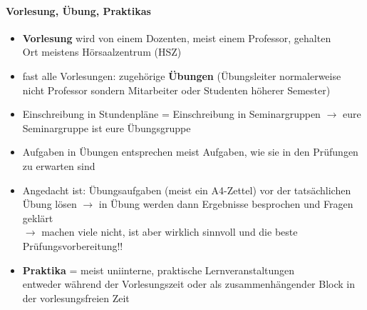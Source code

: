\documentclass[a4paper,12pt]{report}
\begin{document}
\paragraph{Vorlesung, Übung, Praktikas}
\begin{itemize}
	\item \textbf{Vorlesung} wird von einem Dozenten, meist einem Professor, gehalten\\
	Ort meistens Hörsaalzentrum (HSZ)
	\item fast alle Vorlesungen: zugehörige \textbf{Übungen} (Übungsleiter normalerweise nicht Professor sondern Mitarbeiter oder Studenten höherer Semester)
	\item Einschreibung in Stundenpläne = Einschreibung in Seminargruppen $\rightarrow$ eure Seminargruppe ist eure Übungsgruppe
	\item Aufgaben in Übungen entsprechen meist Aufgaben, wie sie in den Prüfungen zu erwarten sind
	\item Angedacht ist: Übungsaufgaben (meist ein A4-Zettel) vor der tatsächlichen Übung lösen $\rightarrow$ in Übung werden dann Ergebnisse besprochen und Fragen geklärt\\
	$\longrightarrow$ machen viele nicht, ist aber wirklich sinnvoll und die beste Prüfungsvorbereitung!!
	\item \textbf{Praktika} = meist uniinterne, praktische Lernveranstaltungen\\
		entweder während der Vorlesungszeit oder als zusammenhängender Block in der vorlesungsfreien Zeit
\end{itemize}
		
\end{document}
